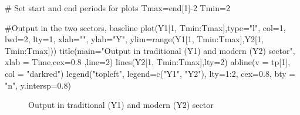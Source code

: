 \documentclass[
  letterpaper,
  DIV=11,
  numbers=noendperiod]{scrreprt}
\newenvironment{Shaded}{\begin{snugshade}}{\end{snugshade}}
\newcommand{\AttributeTok}[1]{\textcolor[rgb]{0.40,0.45,0.13}{#1}}
\newcommand{\CommentTok}[1]{\textcolor[rgb]{0.37,0.37,0.37}{#1}}
\newcommand{\DecValTok}[1]{\textcolor[rgb]{0.68,0.00,0.00}{#1}}
\newcommand{\FloatTok}[1]{\textcolor[rgb]{0.68,0.00,0.00}{#1}}
\newcommand{\FunctionTok}[1]{\textcolor[rgb]{0.28,0.35,0.67}{#1}}
\newcommand{\NormalTok}[1]{\textcolor[rgb]{0.00,0.23,0.31}{#1}}
\newcommand{\OtherTok}[1]{\textcolor[rgb]{0.00,0.23,0.31}{#1}}
\newcommand{\SpecialCharTok}[1]{\textcolor[rgb]{0.37,0.37,0.37}{#1}}
\newcommand{\StringTok}[1]{\textcolor[rgb]{0.13,0.47,0.30}{#1}}
\begin{document}
\begin{Shaded}
\begin{Highlighting}[]
\CommentTok{\# Set start and end periods for plots}
\NormalTok{Tmax}\OtherTok{=}\NormalTok{end[}\DecValTok{1}\NormalTok{]}\SpecialCharTok{{-}}\DecValTok{2}
\NormalTok{Tmin}\OtherTok{=}\DecValTok{2}

\CommentTok{\#Output in the two sectors, baseline}
\FunctionTok{plot}\NormalTok{(Y1[}\DecValTok{1}\NormalTok{, Tmin}\SpecialCharTok{:}\NormalTok{Tmax],}\AttributeTok{type=}\StringTok{"l"}\NormalTok{, }\AttributeTok{col=}\DecValTok{1}\NormalTok{, }\AttributeTok{lwd=}\DecValTok{2}\NormalTok{, }\AttributeTok{lty=}\DecValTok{1}\NormalTok{, }\AttributeTok{xlab=}\StringTok{""}\NormalTok{, }\AttributeTok{ylab=}\StringTok{"Y"}\NormalTok{, }\AttributeTok{ylim=}\FunctionTok{range}\NormalTok{(Y1[}\DecValTok{1}\NormalTok{, Tmin}\SpecialCharTok{:}\NormalTok{Tmax],Y2[}\DecValTok{1}\NormalTok{, Tmin}\SpecialCharTok{:}\NormalTok{Tmax])) }
\FunctionTok{title}\NormalTok{(}\AttributeTok{main=}\StringTok{"Output in traditional (Y1) and modern (Y2) sector"}\NormalTok{, }\AttributeTok{xlab =} \StringTok{\textquotesingle{}Time\textquotesingle{}}\NormalTok{,}\AttributeTok{cex=}\FloatTok{0.8}\NormalTok{ ,}\AttributeTok{line=}\DecValTok{2}\NormalTok{)}
\FunctionTok{lines}\NormalTok{(Y2[}\DecValTok{1}\NormalTok{, Tmin}\SpecialCharTok{:}\NormalTok{Tmax],}\AttributeTok{lty=}\DecValTok{2}\NormalTok{)}
\FunctionTok{abline}\NormalTok{(}\AttributeTok{v =}\NormalTok{ tp[}\DecValTok{1}\NormalTok{], }\AttributeTok{col =} \StringTok{"darkred"}\NormalTok{)}
\FunctionTok{legend}\NormalTok{(}\StringTok{"topleft"}\NormalTok{, }\AttributeTok{legend=}\FunctionTok{c}\NormalTok{(}\StringTok{"Y1"}\NormalTok{, }\StringTok{"Y2"}\NormalTok{),}
       \AttributeTok{lty=}\DecValTok{1}\SpecialCharTok{:}\DecValTok{2}\NormalTok{, }\AttributeTok{cex=}\FloatTok{0.8}\NormalTok{, }\AttributeTok{bty =} \StringTok{"n"}\NormalTok{, }\AttributeTok{y.intersp=}\FloatTok{0.8}\NormalTok{)}
\end{Highlighting}
\end{Shaded}

\begin{figure}[H]


\caption{\label{fig-output}Output in traditional (Y1) and modern (Y2)
sector}

\end{figure}%
\end{document}
